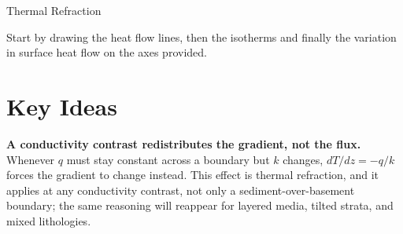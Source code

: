 \begin{activity}[Warm-up]{Thermal Refraction}
\begin{questions}
  Start by drawing the heat flow lines, then the isotherms and finally the variation in surface heat flow on the axes provided.

  \medskip

  \begin{center}
  \end{center}

\end{questions}

\section*{Key Ideas}

\textbf{A conductivity contrast redistributes the gradient, not the flux.} Whenever $q$ must stay constant across a boundary but $k$ changes, $dT/dz = -q/k$ forces the gradient to change instead. This effect is thermal refraction, and it applies at any conductivity contrast, not only a sediment-over-basement boundary; the same reasoning will reappear for layered media, tilted strata, and mixed lithologies.
\begin{figure}[h]
  \centering
\end{figure}
\end{activity}
